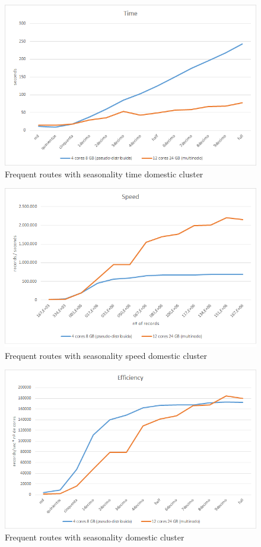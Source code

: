 \begin{figure}[htp!]
	\centering
	\caption{Frequent routes with seasonality time domestic cluster}
	\label{tfdd}
	\vspace{5pt}
	\includegraphics[scale=0.8]{geng/tfdd}
\end{figure}
\begin{figure}[htp!]
	\centering
	\caption{Frequent routes with seasonality speed domestic cluster}
	\label{sfdd}
	\vspace{5pt}
	\includegraphics[scale=0.85]{geng/sfdd}
\end{figure}
\begin{figure}[htp!]
	\centering
	\caption{Frequent routes with seasonality domestic cluster}
	\label{efdd}
	\vspace{5pt}
	\includegraphics[scale=0.85]{geng/efdd}
\end{figure}

